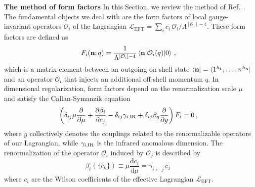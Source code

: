 \documentclass[prl,twocolumn,twoside,preprintnumbers,superscriptaddress, nofootinbib]{revtex4-2}
\renewcommand{\vec}[1]{{\mathbf #1}}
\newcommand{\txt}[1]{\textup{#1}}
\newcommand{\GL}[1]{{\color{teal}[\underline{\bf GL}:~{\bf #1}]}}
\begin{document}
{\bf The method of form factors} In this Section, we review the method of Ref.~\cite{Caron-Huot:2016cwu}.
%
The fundamental objects we deal with are the form factors of local gauge-invariant operators $\mathcal{O}_i$ of the Lagrangian
$\mathcal L_{\text{EFT}} = \sum_i c_i \, \mathcal O_i / \Lambda^{[\mathcal O_i]-4}$.
These form factors are defined as
%
\begin{equation}
    F_i(\vec n;q)= \frac{1}{\Lambda^{[\mathcal O_i]-4}}\mel*{\vec n}{\mathcal O_i(q)}{0}\,,
\end{equation}
%
which is a matrix element between an outgoing on-shell state $\bra{\vec n}=\bra{1^{h_1},\dotsc,n^{h_n}}$ and an operator $\mathcal O_i$ that 
injects an additional off-shell momentum $q$.
In dimensional regularization, form factors depend
on the renormalization scale $\mu$ and satisfy 
the Callan-Symanzik equation
%
\begin{equation}
\label{eq:CSEq}
    \left(\delta_{ij} \mu\frac{\partial}{\partial \mu}+ \frac{\partial \beta_i}{\partial c_j}-\delta_{ij}\gamma_{i,\txt{IR}} +\delta_{ij}\beta_g\frac{\partial}{\partial g}\right)F_i=   0\,,
\end{equation}
%
where $g$ collectively denotes the couplings related to the renormalizable operators of our Lagrangian, while $\gamma_{i,\txt{IR}}$ is the infrared anomalous dimension. 
The renormalization of the operator $\mathcal{O}_i$ induced by 
$\mathcal{O}_j$ is described by
%
\begin{equation}
\beta_i(\{c_k\}) \equiv \mu \frac{\text{d} c_i}{ \text{d} \mu} = \gamma_{i\leftarrow j} \, c_j \, 
\end{equation}
%
where $c_i$ are the Wilson coefficients of the effective Lagrangian $\mathcal{L}_{\text{EFT}}$.
\end{document}
